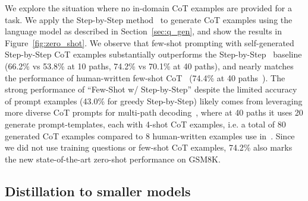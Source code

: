 \documentclass{article} %
\newcommand{\note}[1]{\textcolor{red}{[Jiaxin: #1]}}
\newcommand{\sg}[1]{\textcolor{orange}{[Shane: #1]}}
\begin{document}

We explore the situation where no in-domain CoT examples are provided for a task. We apply the Step-by-Step method~\citep{step_by_step} to generate CoT examples using the language model as described in Section~\ref{sec:q_gen}, and show the results in Figure~\ref{fig:zero_shot}. We observe that few-shot prompting with self-generated Step-by-Step CoT examples substantially outperforms the Step-by-Step~\citep{step_by_step} baseline (66.2\% vs 53.8\% at 10 paths, 74.2\% vs 70.1\% at 40 paths), and nearly matches the performance of human-written few-shot CoT~\citep{wei2021finetuned} (74.4\% at 40 paths~\citep{Wang2022SelfConsistencyIC}). The strong performance of ``Few-Shot w/ Step-by-Step'' despite the limited accuracy of prompt examples (43.0\% for greedy Step-by-Step) likely comes from leveraging more diverse CoT prompts for multi-path decoding~\citep{Li2022OnTA}, where at 40 paths it uses 20 generate prompt-templates, each with 4-shot CoT examples, i.e. a total of 80 generated CoT examples compared to 8 human-written examples use in~\citet{Wei2022ChainOT}. Since we did not use training questions or few-shot CoT examples, 74.2\% also marks the new state-of-the-art zero-shot performance on GSM8K.


\subsection{Distillation to smaller models}
\label{sec:exp_distill}
\end{document}

